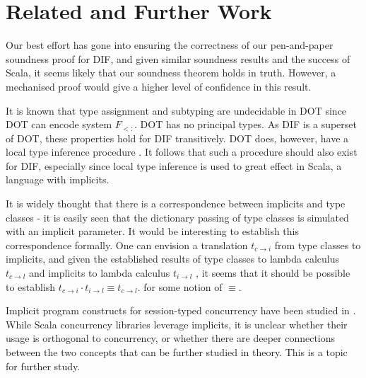 \section{Related and Further Work}

Our best effort has gone into ensuring the correctness of our pen-and-paper
soundness proof for DIF, and given similar soundness results and the success of
Scala, it seems likely that our soundness theorem holds in truth. However, a
mechanised proof would give a higher level of confidence in this result.

It is known that type assignment and subtyping are undecidable in DOT
\cite{AR16} since DOT can encode system $F_{<:}$. DOT has no principal types. As
DIF is a superset of DOT, these properties hold for DIF transitively. DOT does,
however, have a local type inference procedure \cite{PT00}. It follows that such
a procedure should also exist for DIF, especially since local type inference is
used to great effect in Scala, a language with implicits.

It is widely thought that there is a correspondence between implicits and type
classes - it is easily seen that the dictionary passing of type classes is
simulated with an implicit parameter. It would be interesting to establish this
correspondence formally. One can envision a translation $t_{c \rightarrow i}$
from type classes to implicits, and given the established results of type
classes to lambda calculus $t_{c \rightarrow l}$ \cite{WB89} and implicits to
lambda calculus $t_{i \rightarrow l}$ \cite{OBLB18}, it seems that it should be
possible to establish $t_{c \rightarrow i} \cdot t_{i \rightarrow l} \equiv t_{c
\rightarrow l}$. for some notion of $\equiv$.

Implicit program constructs for session-typed concurrency have been studied in
\cite{JB18}. While Scala concurrency libraries leverage implicits, it is unclear
whether their usage is orthogonal to concurrency, or whether there are deeper
connections between the two concepts that can be further studied in theory. This
is a topic for further study.
